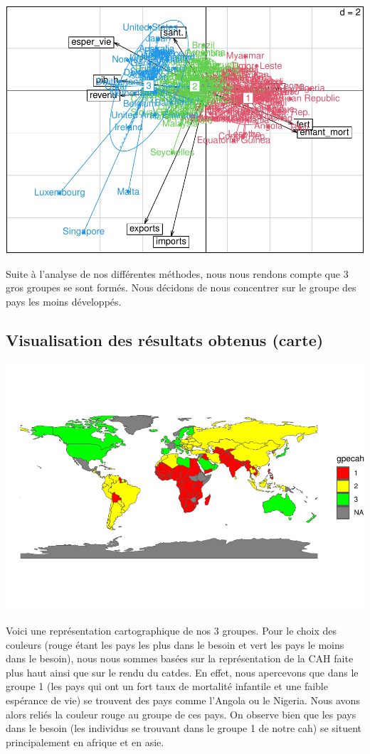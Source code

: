 \documentclass[
]{article}
\begin{document}
\includegraphics{Projet_files/figure-latex/unnamed-chunk-27-1.pdf}

Suite à l'analyse de nos différentes méthodes, nous nous rendons compte
que 3 gros groupes se sont formés. Nous décidons de nous concentrer sur
le groupe des pays les moins développés.

\hypertarget{visualisation-des-ruxe9sultats-obtenus-carte}{%
\subsection{Visualisation des résultats obtenus
(carte)}\label{visualisation-des-ruxe9sultats-obtenus-carte}}

\includegraphics{Projet_files/figure-latex/unnamed-chunk-28-1.pdf}

Voici une représentation cartographique de nos 3 groupes. Pour le choix
des couleurs (rouge étant les pays les plus dans le besoin et vert les
pays le moins dans le besoin), nous nous sommes basées sur la
représentation de la CAH faite plus haut ainsi que sur le rendu du
catdes. En effet, nous apercevons que dans le groupe 1 (les pays qui ont
un fort taux de mortalité infantile et une faible espérance de vie) se
trouvent des pays comme l'Angola ou le Nigeria. Nous avons alors reliés
la couleur rouge au groupe de ces pays. On observe bien que les pays
dans le besoin (les individus se trouvant dans le groupe 1 de notre cah)
se situent principalement en afrique et en asie.
\end{document}
